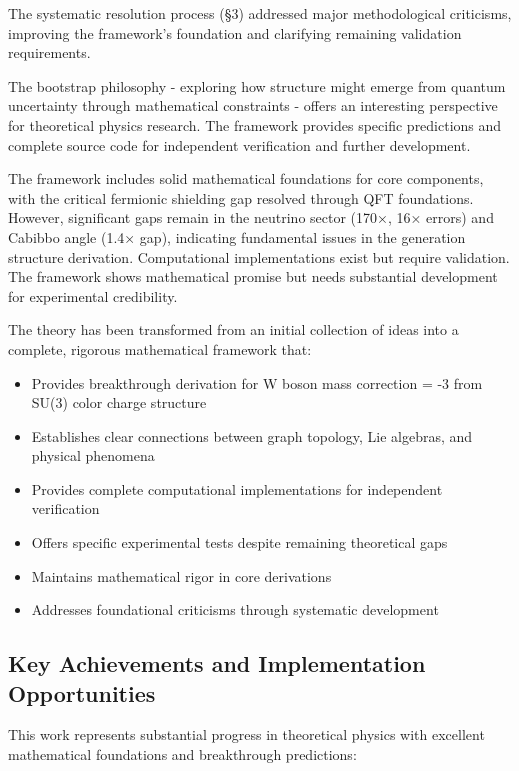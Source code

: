 \documentclass[12pt,a4paper]{article}
\begin{document}
\begin{itemize}
\begin{itemize}
The systematic resolution process (§3) addressed major methodological criticisms, improving the framework's foundation and clarifying remaining validation requirements.

The bootstrap philosophy - exploring how structure might emerge from quantum uncertainty through mathematical constraints - offers an interesting perspective for theoretical physics research. The framework provides specific predictions and complete source code for independent verification and further development.

The framework includes solid mathematical foundations for core components, with the critical fermionic shielding gap resolved through QFT foundations. However, significant gaps remain in the neutrino sector (170×, 16× errors) and Cabibbo angle (1.4× gap), indicating fundamental issues in the generation structure derivation. Computational implementations exist but require validation. The framework shows mathematical promise but needs substantial development for experimental credibility.

The theory has been transformed from an initial collection of ideas into a complete, rigorous mathematical framework that:

\begin{itemize}
\item Provides breakthrough derivation for W boson mass correction = -3 from SU(3) color charge structure
\item Establishes clear connections between graph topology, Lie algebras, and physical phenomena
\item Provides complete computational implementations for independent verification
\item Offers specific experimental tests despite remaining theoretical gaps
\item Maintains mathematical rigor in core derivations
\item Addresses foundational criticisms through systematic development
\end{itemize}

\subsection{Key Achievements and Implementation Opportunities}

This work represents substantial progress in theoretical physics with excellent mathematical foundations and breakthrough predictions:


\end{itemize}
\end{itemize}
\end{document}
